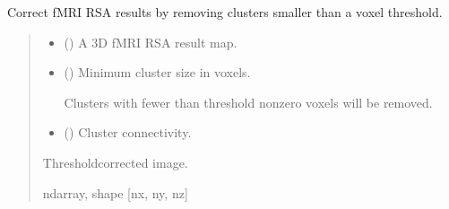\documentclass[letterpaper,10pt,english]{sphinxhowto}
\begin{document}

\begin{fulllineitems}
\label{\detokenize{stuff:neurora.stuff.correct_by_threshold}}
\pysigstartsignatures
{}
\pysigstopsignatures
\sphinxAtStartPar
Correct fMRI RSA results by removing clusters smaller than a voxel threshold.
\begin{quote}\begin{description}
\begin{itemize}
\item {} 
\sphinxAtStartPar
{} (\sphinxstyleliteralemphasis{\sphinxupquote{, }}\sphinxstyleliteralemphasis{\sphinxupquote{ {[}}}\sphinxstyleliteralemphasis{\sphinxupquote{, }}\sphinxstyleliteralemphasis{\sphinxupquote{, }}\sphinxstyleliteralemphasis{\sphinxupquote{{]}}}) \textendash{} A 3\sphinxhyphen{}D fMRI RSA result map.

\item {} 
\sphinxAtStartPar
{} () \textendash{} 
\sphinxAtStartPar
Minimum cluster size in voxels.

\sphinxAtStartPar
Clusters with fewer than threshold non\sphinxhyphen{}zero voxels will be removed.


\item {} 
\sphinxAtStartPar
{} (\sphinxstyleliteralemphasis{\sphinxupquote{, }}\sphinxstyleliteralemphasis{\sphinxupquote{, }}\sphinxstyleliteralemphasis{\sphinxupquote{, }}) \textendash{} Cluster connectivity.

\end{itemize}

\sphinxAtStartPar
{} \textendash{} Threshold\sphinxhyphen{}corrected image.

\sphinxAtStartPar
ndarray, shape {[}nx, ny, nz{]}

\end{description}\end{quote}

\end{fulllineitems}
\end{document}
